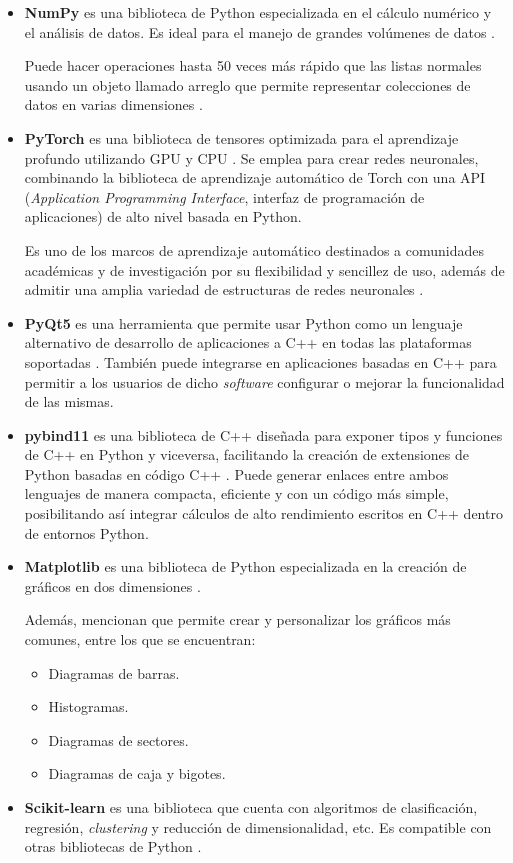 \begin{itemize}
	\item\textbf{NumPy} es una biblioteca de Python especializada en el cálculo numérico y el análisis de datos. Es ideal para el manejo de grandes volúmenes de datos \cite{alfaro_numpy}.
	
	Puede hacer operaciones hasta 50 veces más rápido que las listas normales usando un objeto llamado arreglo que permite representar colecciones de datos en varias dimensiones \cite{alfaro_numpy}.
	
	\item\textbf{PyTorch} es una biblioteca de tensores optimizada para el aprendizaje profundo utilizando GPU y CPU \cite{pytorch_1}. Se emplea para crear redes neuronales, combinando la biblioteca de aprendizaje automático de Torch con una API (\textit{Application Programming Interface}, interfaz de programación de aplicaciones) de alto nivel basada en Python. 
	
	Es uno de los marcos de aprendizaje automático destinados a comunidades académicas y de investigación por su flexibilidad y sencillez de uso, además de admitir una amplia variedad de estructuras de redes neuronales \cite{pytorch_2}.
	
	\item \textbf{PyQt5} es una herramienta que permite usar Python como un lenguaje alternativo de desarrollo de aplicaciones a C++ en todas las plataformas soportadas \cite{qt_1}. También puede integrarse en aplicaciones basadas en C++ para permitir a los usuarios de dicho \textit{software} configurar o mejorar la funcionalidad de las mismas.
	
	\item \textbf{pybind11} es una biblioteca de C++ diseñada para exponer tipos y funciones de C++ en Python y viceversa, facilitando la creación de extensiones de Python basadas en código C++ \cite{pybind_pybind}. Puede generar enlaces entre ambos lenguajes de manera compacta, eficiente y con un código más simple, posibilitando así integrar cálculos de alto rendimiento escritos en C++ dentro de entornos Python.
	
	\item\textbf{Matplotlib} es una biblioteca de Python especializada en la creación de gráficos en dos dimensiones \cite{alferez_matplotlib}.
	
	Además, mencionan que permite crear y personalizar los gráficos más comunes, entre los que se encuentran:
	\begin{itemize}
		\item Diagramas de barras.
		\item Histogramas.
		\item Diagramas de sectores.
		\item Diagramas de caja y bigotes.
	\end{itemize}
	
	\item \textbf{Scikit-learn} es una biblioteca que cuenta con algoritmos de clasificación, regresión, \textit{clustering} y reducción de dimensionalidad, etc. Es compatible con otras bibliotecas de Python \cite{mds_scikitlearn}.
\end{itemize}

